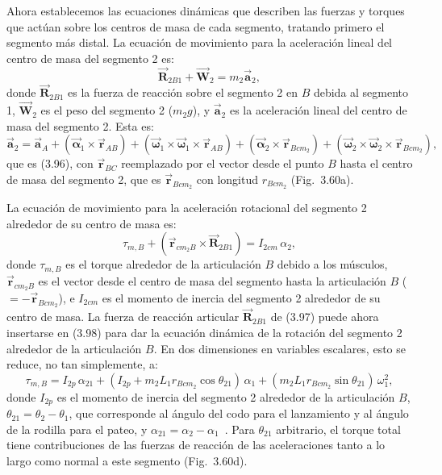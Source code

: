 \documentclass[12pt]{book}
\begin{document}
Ahora establecemos las ecuaciones dinámicas que describen las fuerzas y torques que actúan sobre los centros de masa de cada segmento, tratando primero el segmento más distal. La ecuación de movimiento para la aceleración lineal del centro de masa del segmento 2 es:
\begin{equation}
\vec{\mathbf{R}}_{2B1} + \vec{\mathbf{W}}_2 = m_2 \vec{\mathbf{a}}_2,
\label{eq:3.97}
\end{equation}
donde $\vec{\mathbf{R}}_{2B1}$ es la fuerza de reacción sobre el segmento 2 en $B$ debida al segmento 1, $\vec{\mathbf{W}}_2$ es el peso del segmento 2 ($m_2 g$), y $\vec{\mathbf{a}}_2$ es la aceleración lineal del centro de masa del segmento 2. Esta es:
\begin{equation}
\vec{\mathbf{a}}_2 = \vec{\mathbf{a}}_A + (\vec{\mathbf{\alpha}}_1 \times \vec{\mathbf{r}}_{AB}) + (\vec{\mathbf{\omega}}_1 \times \vec{\mathbf{\omega}}_1 \times \vec{\mathbf{r}}_{AB}) + (\vec{\mathbf{\alpha}}_2 \times \vec{\mathbf{r}}_{Bcm_2}) + (\vec{\mathbf{\omega}}_2 \times \vec{\mathbf{\omega}}_2 \times \vec{\mathbf{r}}_{Bcm_2}),
\label{eq:3.98}
\end{equation}
que es (3.96), con $\vec{\mathbf{r}}_{BC}$ reemplazado por el vector desde el punto $B$ hasta el centro de masa del segmento 2, que es $\vec{\mathbf{r}}_{Bcm_2}$ con longitud $r_{Bcm_2}$ (Fig.~3.60a).

La ecuación de movimiento para la aceleración rotacional del segmento 2 alrededor de su centro de masa es:
\begin{equation}
\tau_{m,B} + (\vec{\mathbf{r}}_{cm_2 B} \times \vec{\mathbf{R}}_{2B1}) = I_{2cm}\,\alpha_2,
\label{eq:3.99}
\end{equation}
donde $\tau_{m,B}$ es el torque alrededor de la articulación $B$ debido a los músculos, $\vec{\mathbf{r}}_{cm_2 B}$ es el vector desde el centro de masa del segmento hasta la articulación $B$ ($= -\vec{\mathbf{r}}_{Bcm_2}$), e $I_{2cm}$ es el momento de inercia del segmento 2 alrededor de su centro de masa. La fuerza de reacción articular $\vec{\mathbf{R}}_{2B1}$ de (3.97) puede ahora insertarse en (3.98) para dar la ecuación dinámica de la rotación del segmento 2 alrededor de la articulación $B$. En dos dimensiones en variables escalares, esto se reduce, no tan simplemente, a:
\begin{equation}
\tau_{m,B} = I_{2p}\,\alpha_{21} + (I_{2p} + m_2 L_1 r_{Bcm_2} \cos\theta_{21})\,\alpha_1 + (m_2 L_1 r_{Bcm_2} \sin\theta_{21})\,\omega_1^2,
\label{eq:3.100}
\end{equation}
donde $I_{2p}$ es el momento de inercia del segmento 2 alrededor de la articulación $B$, $\theta_{21} = \theta_2 - \theta_1$, que corresponde al ángulo del codo para el lanzamiento y al ángulo de la rodilla para el pateo, y $\alpha_{21} = \alpha_2 - \alpha_1$~\cite{ref42,ref43,ref120}. Para $\theta_{21}$ arbitrario, el torque total tiene contribuciones de las fuerzas de reacción de las aceleraciones tanto a lo largo como normal a este segmento (Fig.~3.60d).
\end{document}
